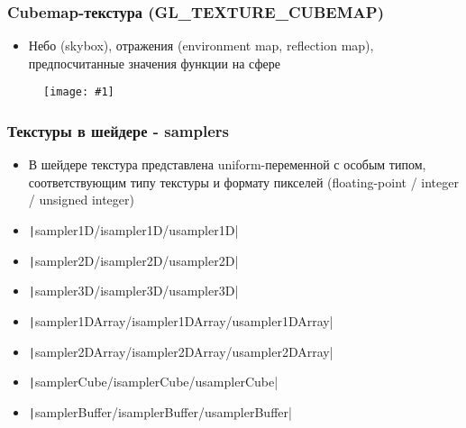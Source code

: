 \documentclass[10pt]{beamer}
\newcommand{\slideimage}[1]{
  \begin{figure}
    \begin{adjustbox}{width=\textwidth, totalheight=\textheight-2\baselineskip-2\baselineskip,keepaspectratio}
      \texttt{[image: \#1]}
    \end{adjustbox}
  \end{figure}
}
\begin{document}

\begin{frame}[fragile]
\frametitle{Cubemap-текстура (GL\_TEXTURE\_CUBEMAP)}
\begin{itemize}
\item Небо (skybox), отражения (environment map, reflection map), предпосчитанные значения функции на сфере
\end{itemize}
\slideimage{texture_cubemap.png}
\end{frame}


\begin{frame}[fragile]
\frametitle{Текстуры в шейдере - samplers}
\begin{itemize}
\item В шейдере текстура представлена uniform-переменной с особым типом, соответствующим типу текстуры и формату пикселей (floating-point / integer / unsigned integer)
\pause
\item \texttt|sampler1D/isampler1D/usampler1D|
\pause
\item \texttt|sampler2D/isampler2D/usampler2D|
\pause
\item \texttt|sampler3D/isampler3D/usampler3D|
\pause
\item \texttt|sampler1DArray/isampler1DArray/usampler1DArray|
\pause
\item \texttt|sampler2DArray/isampler2DArray/usampler2DArray|
\pause
\item \texttt|samplerCube/isamplerCube/usamplerCube|
\pause
\item \texttt|samplerBuffer/isamplerBuffer/usamplerBuffer|
\end{itemize}
\end{frame}
\end{document}
